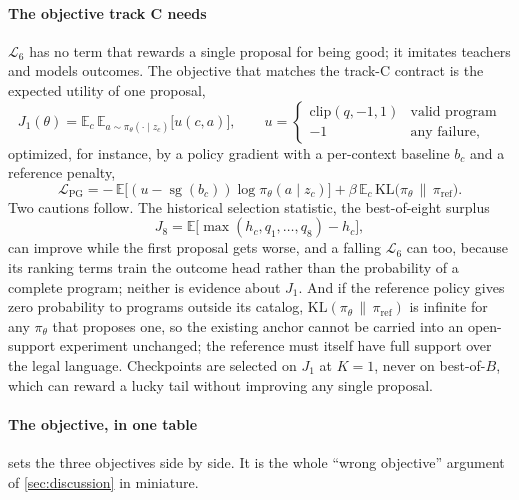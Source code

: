 \paragraph{The objective track C needs} $\mathcal{L}_6$ has no term that rewards a single proposal
for being good; it imitates teachers and models outcomes. The objective that matches the track-C
contract is the expected utility of one proposal,
\begin{equation}
J_1(\theta) = \mathbb{E}_{c}\,\mathbb{E}_{a\sim\pi_\theta(\cdot\mid z_c)}\bigl[u(c,a)\bigr],
\qquad u = \begin{cases}\mathrm{clip}(q,-1,1) & \text{valid program}\\ -1 & \text{any failure,}\end{cases}
\label{eq:j1}
\end{equation}
optimized, for instance, by a policy gradient with a per-context baseline $b_c$ and a reference
penalty,
\begin{equation}
\mathcal{L}_{\mathrm{PG}} = -\,\mathbb{E}\bigl[(u - \operatorname{sg}(b_c))\log\pi_\theta(a\mid z_c)\bigr]
+ \beta\,\mathbb{E}_c\,\mathrm{KL}\bigl(\pi_\theta \,\|\, \pi_{\mathrm{ref}}\bigr).
\label{eq:pg}
\end{equation}
Two cautions follow. The historical selection statistic, the best-of-eight surplus
\begin{equation*}
J_8=\mathbb{E}\bigl[\max(h_c,q_1,\ldots,q_8)-h_c\bigr],
\end{equation*}
can improve while the first proposal gets worse, and a falling $\mathcal{L}_6$ can too, because its ranking terms train the outcome head rather than the
probability of a complete program; neither is evidence about $J_1$. And if the reference policy gives
zero probability to programs outside its
catalog, $\mathrm{KL}(\pi_\theta\,\|\,\pi_{\mathrm{ref}})$ is infinite for any $\pi_\theta$ that
proposes one, so the existing anchor cannot be carried into an open-support experiment unchanged;
the reference must itself have full support over the legal language. Checkpoints are selected on
$J_1$ at $K=1$, never on best-of-$B$, which can reward a lucky tail without improving any single
proposal.

\paragraph{The objective, in one table}  sets the three objectives side by
side. It is the whole ``wrong objective'' argument of \cref{sec:discussion} in miniature.

